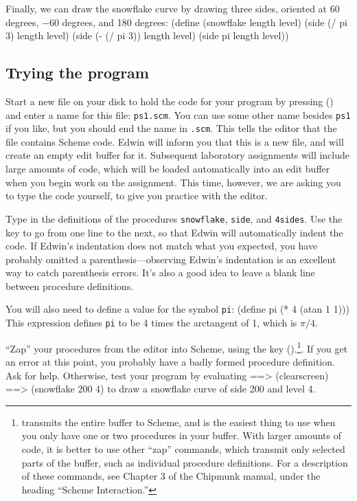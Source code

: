 Finally, we can draw the snowflake curve by drawing three sides,
oriented at 60 degrees, $-60$ degrees, and 180 degrees:
\beginlisp
(define (snowflake length level)
  (side (/ pi 3) length level)
  (side (- (/ pi 3)) length level)
  (side pi length level))
\endlisp

\subsection{Trying the program}

Start a new file on your disk to hold the code for your program by
pressing { (\shift {})} and enter a name for this
file: {\tt ps1.scm}.  You can use some other name besides {\tt ps1} if
you like, but you should end the name in {\tt .scm}.  This tells the
editor that the file contains Scheme code.  Edwin will inform you that
this is a new file, and will create an empty edit buffer for it.
Subsequent laboratory assignments will include large amounts of code,
which will be loaded automatically into an edit buffer when you begin
work on the assignment.  This time, however, we are asking you to type
the code yourself, to give you practice with the editor.

Type in the definitions of the procedures {\tt snowflake}, {\tt side},
and {\tt 4sides}.  Use the  key to go from one line to the
next, so that Edwin will automatically indent the code.  If Edwin's
indentation does not match what you expected, you have probably
omitted a parenthesis---observing Edwin's indentation is an excellent
way to catch parenthesis errors.  It's also a good idea to leave a
blank line between procedure definitions.

You will also need to define a value for the symbol {\tt pi}:
\beginlisp
(define pi (* 4 (atan 1 1)))
\endlisp
This expression defines {\tt pi} to be 4 times the arctangent of 1,
which is $\pi/4$.

``Zap'' your procedures from the editor into Scheme, using the
 key ({\shift {}}).\footnote{ transmits the entire buffer to Scheme, and is the easiest
thing to use when you only have one or two procedures in your buffer.
With larger amounts of code, it is better to use other ``zap''
commands, which transmit only selected parts of the buffer, such as
individual procedure definitions.  For a description of these
commands, see Chapter 3 of the Chipmunk manual, under the heading
``Scheme Interaction.''}.  If you get an error at this point, you
probably have a badly formed procedure definition.  Ask for help.
Otherwise, test your program by evaluating
\beginlisp
==> (clearscreen)
\null
==> (snowflake 200 4)
\endlisp
to draw a snowflake curve of side 200 and level 4.


